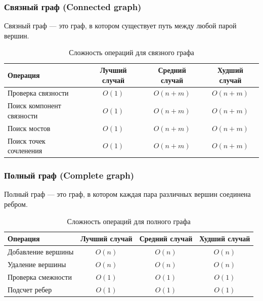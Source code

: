 \documentclass[a4paper,12pt]{article}
\begin{document}
\subsubsection{Связный граф (Connected graph)}
\label{subsubsec:связный-граф-connected-graph}

Связный граф --- это граф, в котором существует путь между любой парой вершин.

\begin{table}[H]
    \centering
    \begin{tabular}{|l|c|c|c|}
        \hline
        Операция & Лучший случай & Средний случай & Худший случай \\
        \hline
        Проверка связности & $O(1)$ & $O(n + m)$ & $O(n + m)$ \\
        \hline
        \makecell[l]{Поиск компонент \\связности} & $O(1)$ & $O(n + m)$ & $O(n + m)$ \\
        \hline
        Поиск мостов & $O(1)$ & $O(n + m)$ & $O(n + m)$ \\
        \hline
        Поиск точек сочленения & $O(1)$ & $O(n + m)$ & $O(n + m)$ \\
        \hline
    \end{tabular}
    \caption{Сложность операций для связного графа}
\end{table}

\subsubsection{Полный граф (Complete graph)}
\label{subsubsec:полный-граф-complete-graph}

Полный граф --- это граф, в котором каждая пара различных вершин соединена ребром.

\begin{table}[H]
    \centering
    \begin{tabular}{|l|c|c|c|}
        \hline
        Операция & Лучший случай & Средний случай & Худший случай \\
        \hline
        Добавление вершины & $O(n)$ & $O(n)$ & $O(n)$ \\
        \hline
        Удаление вершины & $O(n)$ & $O(n)$ & $O(n)$ \\
        \hline
        Проверка смежности & $O(1)$ & $O(1)$ & $O(1)$ \\
        \hline
        Подсчет ребер & $O(1)$ & $O(1)$ & $O(1)$ \\
        \hline
    \end{tabular}
    \caption{Сложность операций для полного графа}
\end{table}
\end{document}
